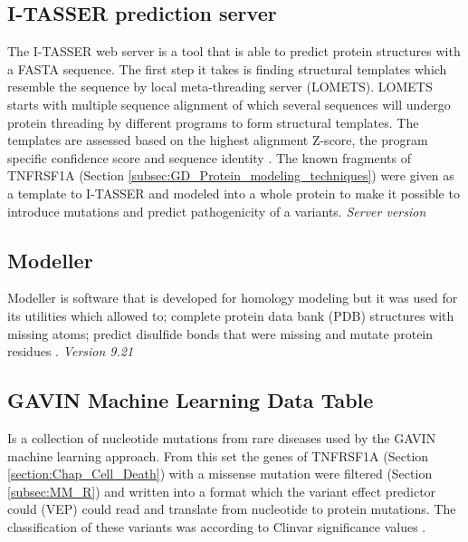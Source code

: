 \subsection{I-TASSER prediction server}
The I-TASSER web server is a tool that is able to predict protein structures with a FASTA sequence. The first step it takes is finding structural templates which resemble the sequence by local meta-threading server (LOMETS). LOMETS starts with multiple sequence alignment of which several sequences will undergo protein threading by different programs to form structural templates. The templates are assessed based on the highest alignment Z-score, the program specific confidence score and sequence identity \cite{zhang_lab_lomets_nodate, wu_lomets:_2007}.
The known fragments of TNFRSF1A (Section \ref{subsec:GD_Protein_modeling_techniques}) were given as a template to I-TASSER and modeled into a whole protein to make it possible to introduce mutations and predict pathogenicity of a variants.
\label{subsec:MM_I_TASSER}
\newline
\textit{Server version}

\subsection{Modeller}
Modeller is software that is developed for homology modeling but it was used for its utilities which allowed to; complete protein data bank (PDB) structures with missing atoms; predict disulfide bonds that were missing and mutate protein residues \cite{modeller_about_nodate,eswar_comparative_2006}. 
\label{subsec:MM_Modeller}
\newline
\textit{Version 9.21}

\subsection{GAVIN Machine Learning Data Table}
Is a collection of nucleotide mutations from rare diseases used by the GAVIN \cite{van_der_velde_gavin:_2017} machine learning approach. From this set the genes of TNFRSF1A (Section \ref{section:Chap_Cell_Death}) with a missense mutation were filtered (Section \ref{subsec:MM_R}) and written into a format which the variant effect predictor could (VEP) \cite{ensembl_variant_nodate} could read and translate from nucleotide to protein mutations. The classification of these variants was according to Clinvar significance values \cite{ncbi_representation_nodate}. 
\label{subsec:MM_GAVIN_data_table}

